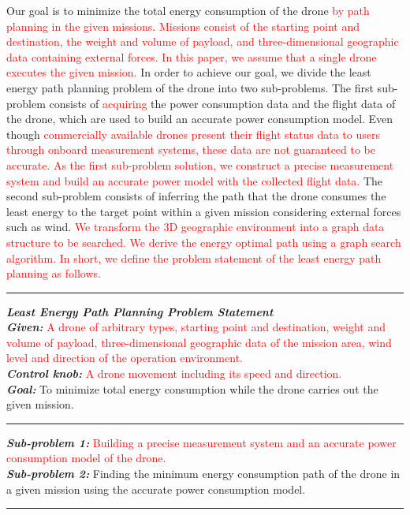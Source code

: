 \documentclass[journal]{./template/IEEEtran}
\begin{document}
Our goal is to minimize the total energy consumption of the drone \textcolor{red}{by path planning in the given missions}.
\textcolor{red}{Missions consist of the starting point and destination, the weight and volume of payload, and three-dimensional geographic data containing external forces.
In this paper, we assume that a single drone executes the given mission.}
In order to achieve our goal, we divide the least energy path planning problem of the drone into two sub-problems.
The first sub-problem consists of \textcolor{red}{acquiring} the power consumption data and the flight data of the drone, which are used to build an accurate power consumption model.
Even though \textcolor{red}{commercially available drones present their flight status data to users through onboard measurement systems, these data are not guaranteed to be accurate. 
As the first sub-problem solution, we construct a precise measurement system and build an accurate power model with the collected flight data.}
The second sub-problem consists of inferring the path that the drone consumes the least energy to the target point within a given mission considering external forces such as wind. 
\textcolor{red}{We transform the 3D geographic environment into a graph data structure to be searched. 
We derive the energy optimal path using a graph search algorithm.
In short, we define the problem statement of the least energy path planning as follows.}

\vspace{5pt}
\hrule
\vspace{5pt}
\noindent\textit{\textbf{Least Energy Path Planning Problem Statement}}
~\\
\noindent\textit{\textbf{Given:}} \textcolor{red}{A drone of arbitrary types, starting point and destination, weight and volume of payload, three-dimensional geographic data of the mission area, wind level and direction of the operation environment.}
~\\
\noindent\textit{\textbf{Control knob:}} \textcolor{red}{A drone movement including its speed and direction.}
~\\
\noindent\textit{\textbf{Goal:}} To minimize total energy consumption while the drone carries out the given mission.
\vspace{5pt}
\hrule
\vspace{5pt}
\noindent\textit{\textbf{Sub-problem 1:}} \textcolor{red}{Building a precise measurement system and an accurate power consumption model of the drone.}
~\\
\noindent\textit{\textbf{Sub-problem 2:}} Finding the minimum energy consumption path of the drone in a given mission using the accurate power consumption model.
\vspace{5pt}
\hrule
\vspace{5pt}
\end{document}
